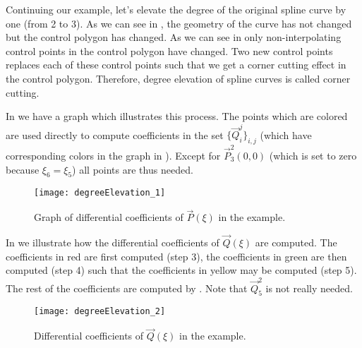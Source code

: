 Continuing our example, let's elevate the degree of the original spline curve by one (from 2 to 3). As we can see in , the geometry of the curve has not changed but the control polygon has changed. As we can see in  only non-interpolating control points in the control polygon have changed. Two new control points replaces each of these control points such that we get a corner cutting effect in the control polygon. Therefore, degree elevation of spline curves is called corner cutting. 

In  we have a graph which illustrates this process. The points which are colored are used directly to compute coefficients in the set $\{\vec{Q}_i^j\}_{i,j}$ (which have corresponding colors in the graph in ). Except for $\vec{P}_3^2(0,0)$ (which is set to zero because $\xi_6 = \xi_5$) all points are thus needed.

\begin{figure}
	\centering
	\texttt{[image: degreeElevation\_1]}
	\caption{Graph of differential coefficients of $\vec{P}(\xi)$ in the example.}
	\label{Fig:graphDiffCoeff1}
\end{figure}
In  we illustrate how the differential coefficients of $\vec{Q}(\xi)$ are computed. The coefficients in red are first computed (step 3), the coefficients in green are then computed (step 4) such that the coefficients in yellow may be computed (step 5). The rest of the coefficients are computed by . Note that $\vec{Q}_5^2$ is not really needed.
\begin{figure}
	\centering
	\texttt{[image: degreeElevation\_2]}
	\caption{Differential coefficients of $\vec{Q}(\xi)$ in the example.}
	\label{Fig:graphDiffCoeff2}
\end{figure}
\newpage
